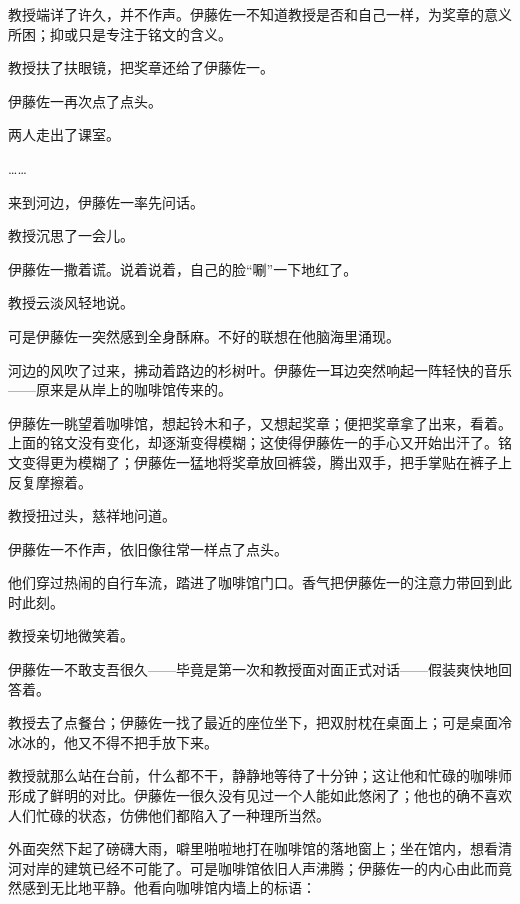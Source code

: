 教授端详了许久，并不作声。伊藤佐一不知道教授是否和自己一样，为奖章的意义所困；抑或只是专注于铭文的含义。

教授扶了扶眼镜，把奖章还给了伊藤佐一。

伊藤佐一再次点了点头。

两人走出了课室。

……

来到河边，伊藤佐一率先问话。


教授沉思了一会儿。


伊藤佐一撒着谎。说着说着，自己的脸“唰”一下地红了。

教授云淡风轻地说。

可是伊藤佐一突然感到全身酥麻。不好的联想在他脑海里涌现。

河边的风吹了过来，拂动着路边的杉树叶。伊藤佐一耳边突然响起一阵轻快的音乐——原来是从岸上的咖啡馆传来的。

伊藤佐一眺望着咖啡馆，想起铃木和子，又想起奖章；便把奖章拿了出来，看着。上面的铭文没有变化，却逐渐变得模糊；这使得伊藤佐一的手心又开始出汗了。铭文变得更为模糊了；伊藤佐一猛地将奖章放回裤袋，腾出双手，把手掌贴在裤子上反复摩擦着。

教授扭过头，慈祥地问道。

伊藤佐一不作声，依旧像往常一样点了点头。

他们穿过热闹的自行车流，踏进了咖啡馆门口。香气把伊藤佐一的注意力带回到此时此刻。

教授亲切地微笑着。

伊藤佐一不敢支吾很久——毕竟是第一次和教授面对面正式对话——假装爽快地回答着。

教授去了点餐台；伊藤佐一找了最近的座位坐下，把双肘枕在桌面上；可是桌面冷冰冰的，他又不得不把手放下来。

教授就那么站在台前，什么都不干，静静地等待了十分钟；这让他和忙碌的咖啡师形成了鲜明的对比。伊藤佐一很久没有见过一个人能如此悠闲了；他也的确不喜欢人们忙碌的状态，仿佛他们都陷入了一种理所当然。

外面突然下起了磅礴大雨，噼里啪啦地打在咖啡馆的落地窗上；坐在馆内，想看清河对岸的建筑已经不可能了。可是咖啡馆依旧人声沸腾；伊藤佐一的内心由此而竟然感到无比地平静。他看向咖啡馆内墙上的标语：
\begin{quote}
\begin{center}
\end{center}
\end{quote}

